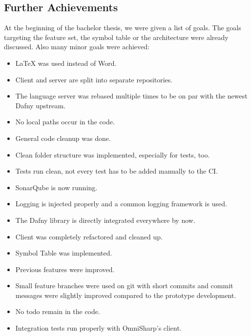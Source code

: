 \subsection{Further Achievements}
At the beginning of the bachelor thesis, we were given a list of goals.
The goals targeting the feature set, the symbol table or the architecture were already discussed.
Also many minor goals were achieved:
\begin{itemize}
    \item LaTeX was used instead of Word.
    \item Client and server are split into separate repositories.
    \item The language server was rebased multiple times to be on par with the newest Dafny upstream.
    \item No local paths occur in the code.
    \item General code cleanup was done.
    \item Clean folder structure was implemented, especially for tests, too.
    \item Tests run clean, not every test has to be added manually to the CI.
    \item SonarQube is now running.
    \item Logging is injected properly and a common logging framework is used.
    \item The Dafny library is directly integrated everywhere by now.
    \item Client was completely refactored and cleaned up.
    \item Symbol Table was implemented.
    \item Previous features were improved.
    \item Small feature branches were used on git with short commits and commit messages were slightly improved compared to the prototype development.
    \item No todo remain in the code.
    \item Integration tests run properly with OmniSharp's client.
\end{itemize}
